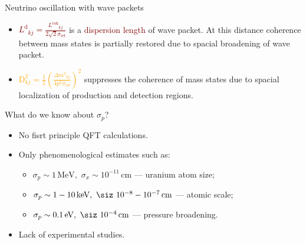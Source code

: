 \documentclass[usenames, dvipsnames]{beamer}
\newcommand{\Lcoh}{\ensuremath{L^{\text{coh}}}}
\newcommand{\Ld}{\ensuremath{L^{\text{d}}}}
\newcommand{\Dm}{\ensuremath{\Delta m^2}}
\newcommand{\Important}{\textcolor{BrickRed}}
\newcommand{\Orange}{\textcolor{Orange}}
\newcommand{\Maroon}{\textcolor{Maroon}}
\newcommand{\impitem}{\item[\Important{$\bullet$}]}
\newcommand{\orangeitem}{\item[\Orange{$\bullet$}]}
\newcommand{\pineitem}{\item[\Maroon{$\bullet$}]}
\newcommand{\sip}{\ensuremath{\sigma_p}}
\newcommand{\six}{\ensuremath{\sigma_x}}
\begin{document}
\begin{frame}[fragile]
\begin{columns}[T]
\begin{column}{.47\textwidth}
\begin{block}{Neutrino oscillation with wave packets}
\begin{itemize}
\begin{itemize}
            At this distance separation of wave packets due to different group
            velocities suppresses interference between mass states.
        \pineitem \Maroon{$\Ld_{kj}  =
            \frac{\Lcoh_{kj}}{2\sqrt{2}\sigma_{\text{rel}}}$} is a
            \Maroon{dispersion length} of wave packet. At this distance
             coherence between mass states is partially restored due to
             spacial broadening of wave packet.
         \orangeitem \Orange{\ensuremath{ \text{D}^2_{kj} =\frac{1}{2} \left(
             \frac{\Dm_{kj}}{4 p^2\sigma_\text{rel}} \right)^2}} 
         suppresses the coherence of mass states due to spacial localization of production and
             detection regions.
    \end{itemize}
  \end{itemize}
\end{block}


\begin{block}{What do we know about \sip?}
    \begin{itemize}
        \item No fisrt principle QFT calculations.
        \item Only phenomenological estimates such as:
        \begin{itemize}
            \item $\sip \sim 1\, \text{MeV}, \,\, \six \sim 10^{-11}\, \text{cm}$
                --- uranium atom size;
            \item $\sip \sim 1-10 \, \text{keV}, \,\, \siz ~ 10^{-8} -
                10^{-7} \, \text{cm}$ --- atomic scale;
            \item $\sip \sim 0.1 \, \text{eV}, \,\, \siz ~ 10^{-4} \, \text{cm}$
                --- pressure broadening.
        \end{itemize}
        \impitem Lack of experimental studies.
    \end{itemize}
\end{block}


\end{column}
\end{columns}
\end{frame}
\end{document}
